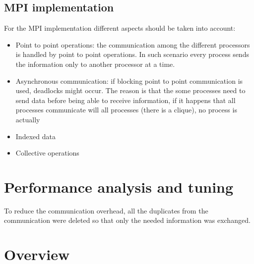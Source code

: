 \documentclass[12pt, a4paper]{article}
\begin{document}
  \subsection*{MPI implementation}
  For the MPI implementation different aspects should be taken into account:
  \begin{itemize}
    \item Point to point operations: the communication among the different
          processors is handled by point to point operations. In such scenario
          every process sends the information only to another processor at a
          time.
    \item Asynchronous communication: if blocking point to point communication 
          is used, deadlocks might occur. The reason is that the some processes
          need to send data before being able to receive information, if it
          happens that all processes communicate will all processes (there is a
          clique), no process is actually 
    \item Indexed data
    \item Collective operations
  \end{itemize}

\section{Performance analysis and tuning}
To reduce the communication overhead, all the duplicates from the communication
were deleted so that only the needed information was exchanged.

\section{Overview}
\end{document}
